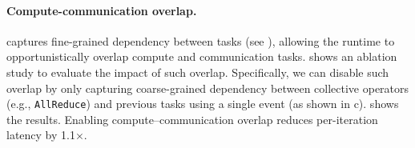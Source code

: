 \paragraph{Compute-communication overlap.} \sys captures fine-grained dependency between tasks (see ), allowing the \sys runtime to opportunistically overlap compute and communication tasks.  shows an ablation study to evaluate the impact of such overlap. Specifically, we can disable such overlap by only capturing coarse-grained dependency between collective operators (e.g., {\tt AllReduce}) and previous tasks using a single event (as shown in c).  shows the results. Enabling compute–communication overlap reduces per-iteration latency by 1.1$\times$.

